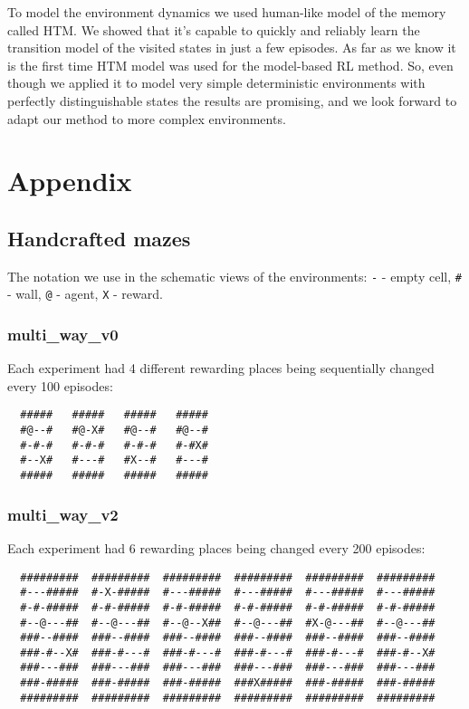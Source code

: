 \documentclass[runningheads]{llncs}
\begin{document}
To model the environment dynamics we used human-like model of the memory called HTM. We showed that it's capable to quickly and reliably learn the transition model of the visited states in just a few episodes. As far as we know it is the first time HTM model was used for the model-based RL method. So, even though we applied it to model very simple deterministic environments with perfectly distinguishable states the results are promising, and we look forward to adapt our method to more complex environments.



\appendix

\section{Appendix}
\subsection{Handcrafted mazes} \label{apx_handcrafted_mazes}

The notation we use in the schematic views of the environments: \verb|-| - empty cell, \verb|#| - wall, \verb|@| - agent, \verb|X| - reward.

\subsubsection{multi\_way\_v0}

Each experiment had 4 different rewarding places being sequentially changed every 100 episodes:

\begin{verbatim}
  #####   #####   #####   #####
  #@--#   #@-X#   #@--#   #@--#
  #-#-#   #-#-#   #-#-#   #-#X#
  #--X#   #---#   #X--#   #---#
  #####   #####   #####   #####
\end{verbatim}

\subsubsection{multi\_way\_v2}

Each experiment had 6 rewarding places being changed every 200 episodes:

\begin{verbatim}
  #########  #########  #########  #########  #########  #########
  #---#####  #-X-#####  #---#####  #---#####  #---#####  #---#####
  #-#-#####  #-#-#####  #-#-#####  #-#-#####  #-#-#####  #-#-#####
  #--@---##  #--@---##  #--@--X##  #--@---##  #X-@---##  #--@---##
  ###--####  ###--####  ###--####  ###--####  ###--####  ###--####
  ###-#--X#  ###-#---#  ###-#---#  ###-#---#  ###-#---#  ###-#--X#
  ###---###  ###---###  ###---###  ###---###  ###---###  ###---###
  ###-#####  ###-#####  ###-#####  ###X#####  ###-#####  ###-#####
  #########  #########  #########  #########  #########  #########
\end{verbatim}
\end{document}
